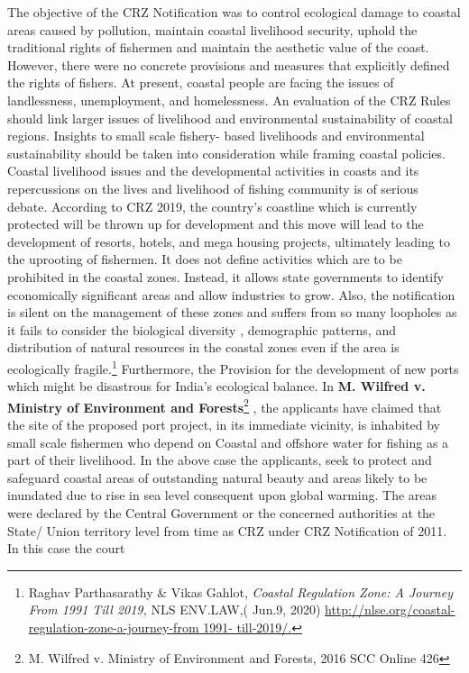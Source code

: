 \begin{multicols}{2}
\noi
The objective of the CRZ Notification was to control ecological damage to coastal areas
caused by pollution, maintain coastal livelihood security, uphold the traditional rights of
fishermen and maintain the aesthetic value of the coast. However, there were no concrete
provisions and measures that explicitly defined the rights of fishers. At present, coastal
people are facing the issues of landlessness, unemployment, and homelessness. An evaluation
of the CRZ Rules should link larger issues of livelihood and environmental sustainability of
coastal regions. Insights to small scale fishery- based livelihoods and environmental
sustainability should be taken into consideration while framing coastal policies. Coastal
livelihood issues and the developmental activities in coasts and its repercussions on the lives
and livelihood of fishing community is of serious debate. According to CRZ 2019, the
country’s coastline which is currently protected will be thrown up for development and this
move will lead to the development of resorts, hotels, and mega housing projects, ultimately
leading to the uprooting of fishermen. It does not define activities which are to be prohibited in the coastal zones. Instead, it allows state governments to identify economically significant
areas and allow industries to grow. Also, the notification is silent on the management of these
zones and suffers from so many loopholes as it fails to consider the biological diversity ,
demographic patterns, and distribution of natural resources in the coastal zones even if the
area is ecologically fragile.\footnote{Raghav Parthasarathy \& Vikas Gahlot, \textit{Coastal Regulation Zone: A Journey From 1991 Till 2019,} NLS ENV.LAW,( Jun.9, 2020) \url{http://nlse.org/coastal-regulation-zone-a-journey-from 1991- till-2019/.}} Furthermore, the Provision for the development of new ports
which might be disastrous for India’s ecological balance. In \textbf{M. Wilfred v. Ministry of
Environment and Forests}\footnote{M. Wilfred v. Ministry of Environment and Forests, 2016 SCC Online 426} , the applicants have claimed that the site of the proposed port
project, in its immediate vicinity, is inhabited by small scale fishermen who depend on
Coastal and offshore water for fishing as a part of their livelihood. In the above case the
applicants, seek to protect and safeguard coastal areas of outstanding natural beauty and areas
likely to be inundated due to rise in sea level consequent upon global warming. The areas
were declared by the Central Government or the concerned authorities at the State/ Union
territory level from time as CRZ under CRZ Notification of 2011. In this case the court

\end{multicols}

